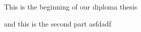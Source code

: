\documentclass[11pt]{scrartcl}
\begin{document}
 
    This is the beginning of our diploma thesis

    and this is the second part
    asfdadf
\end{document}
